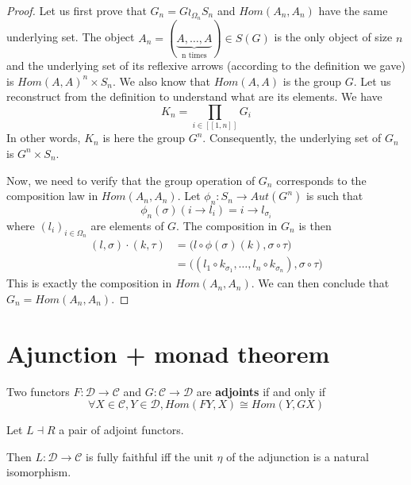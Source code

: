 \begin{proof}
    Let us first prove that $G_n = G\wr_{\Omega_n}S_n$ and $Hom(A_n,A_n)$ have the same underlying set.
    The object $A_n = (\underbrace{A,\dots,A}_\textrm{n times})\in S(G)$ is the only object of size $n$ and the underlying set of its reflexive arrows (according to the definition we gave) is $ Hom(A,A)^{n} \times S_n$. We also know that $Hom(A,A)$ is the group $G$.
    Let us reconstruct from the definition to understand what are its elements.
    We have $$K_n = \prod_{i\in [\![1,n]\!]}G_i$$
    In other words, $K_n$ is here the group $G^n$. Consequently, the underlying set of $G_n$ is $G^n\times S_n$.
    \vspace{0.5cm}

    Now, we need to verify that the group operation of $G_n$ corresponds to the composition law in $Hom(A_n,A_n)$.
    Let $\phi_n : S_n \rightarrow Aut(G^n)$ is such that $$\phi_n(\sigma)(i\rightarrow l_i) = i \rightarrow l_{\sigma_i}$$ where $(l_i)_{i\in \Omega_n}$ are elements of $G$. The composition in $G_n$ is then
    \begin{align*}
        (l,\sigma)\cdot (k,\tau) & = \big(l\circ \phi(\sigma)(k),\sigma\circ\tau\big)                                 \\
                                 & = \big((l_1 \circ k_{\sigma_1},\dots, l_n \circ k_{\sigma_n}),\sigma\circ\tau\big)
    \end{align*}
    This is exactly the composition in $Hom(A_n,A_n)$. We can then conclude that $G_n = Hom(A_n,A_n)$.

\end{proof}





\section{Ajunction + monad theorem}

\begin{defn}[Adjunction]
    Two functors $F : \mathcal{D}\rightarrow \mathcal{C}$ and $G : \mathcal{C} \rightarrow \mathcal{D}$ are \textbf{adjoints} if and only if
    $$\forall X\in \mathcal{C}, Y \in \mathcal{D}, Hom(FY,X) \cong Hom(Y,GX)$$
\end{defn}


\begin{prop}{\cite{wakamatsu1980note}}
    \label{fullSplitEpi}
    Let $L\dashv R$ a pair of adjoint functors.

    Then $L : \mathcal{D}\rightarrow \mathcal{C}$ is fully faithful iff the unit $\eta$ of the adjunction is a natural isomorphism.
\end{prop}


